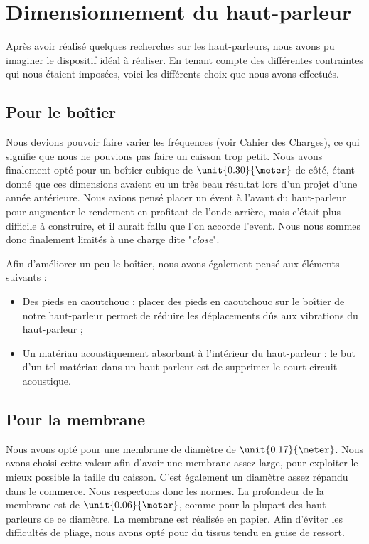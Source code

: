 

\section{Dimensionnement du haut-parleur}
Après avoir réalisé quelques recherches sur les haut-parleurs, nous avons pu imaginer le dispositif idéal 
à réaliser. En tenant compte des différentes contraintes qui nous étaient imposées, voici les différents 
choix que nous avons effectués.

\subsection{Pour le boîtier}
Nous devions pouvoir faire varier les fréquences (voir Cahier des Charges), ce qui signifie que nous ne 
pouvions pas faire un caisson trop petit. Nous avons finalement opté pour un boîtier cubique de 
$\unit{0.30}{\meter}$ de côté, étant donné que ces dimensions avaient eu un très beau résultat lors 
d'un projet d'une année antérieure. Nous avions pensé placer un évent à l'avant du haut-parleur 
pour augmenter le rendement en profitant de l'onde arrière, mais c'était plus difficile à construire, et 
il aurait fallu que l'on accorde l'event. Nous nous sommes donc finalement limités à une charge dite "\textit{close}"\cite{close}.  

Afin d'améliorer un peu le boîtier, nous avons également pensé aux éléments suivants :

\begin{itemize}
	\item	Des pieds en caoutchouc : placer des pieds en caoutchouc sur le boîtier de notre haut-parleur
				permet de réduire les déplacements dûs aux vibrations du haut-parleur ;
	\item	Un matériau acoustiquement absorbant à l'intérieur du haut-parleur : le but d'un tel matériau
				dans un haut-parleur est de supprimer le court-circuit acoustique\cite{absorber}.
\end{itemize}

\subsection{Pour la membrane}
Nous avons opté pour une membrane de diamètre de $\unit{0.17}{\meter}$. Nous avons choisi cette valeur afin 
d'avoir une membrane assez large, pour exploiter le mieux possible la taille du caisson. C'est également un
diamètre assez répandu dans le commerce\cite{tlhp}. Nous respectons donc les normes.
La profondeur de la membrane est de $\unit{0.06}{\meter}$, comme pour la plupart des haut-parleurs de ce
diamètre\cite{tlhp}. La membrane est réalisée en papier. Afin d'éviter les difficultés de pliage, nous avons opté pour
du tissus tendu en guise de ressort. 


